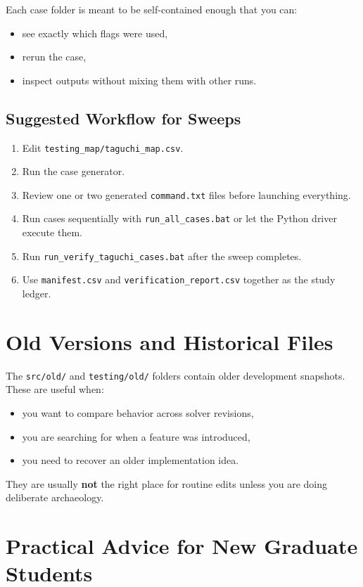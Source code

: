 \documentclass[11pt]{article}
\begin{document}
Each case folder is meant to be self-contained enough that you can:
\begin{itemize}
  \item see exactly which flags were used,
  \item rerun the case,
  \item inspect outputs without mixing them with other runs.
\end{itemize}

\subsection{Suggested Workflow for Sweeps}

\begin{enumerate}
  \item Edit \texttt{testing\_map/taguchi\_map.csv}.
  \item Run the case generator.
  \item Review one or two generated \texttt{command.txt} files before launching everything.
  \item Run cases sequentially with \texttt{run\_all\_cases.bat} or let the Python driver execute them.
  \item Run \texttt{run\_verify\_taguchi\_cases.bat} after the sweep completes.
  \item Use \texttt{manifest.csv} and \texttt{verification\_report.csv} together as the study ledger.
\end{enumerate}

\section{Old Versions and Historical Files}

The \texttt{src/old/} and \texttt{testing/old/} folders contain older development snapshots. These are useful when:
\begin{itemize}
  \item you want to compare behavior across solver revisions,
  \item you are searching for when a feature was introduced,
  \item you need to recover an older implementation idea.
\end{itemize}

They are usually \textbf{not} the right place for routine edits unless you are doing deliberate archaeology.

\section{Practical Advice for New Graduate Students}
\end{document}
